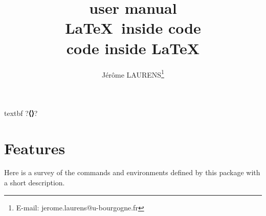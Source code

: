 \documentclass{article}
\begin{document}
\begin{CDRBlockSave}{textbf}
?\textbf{⟨⟩}?
\end{CDRBlockSave}
\title{ user manual\\
\LaTeX\ inside code\\
code inside \LaTeX
}
\author{Jérôme LAURENS\thanks{E-mail: jerome.laurens@u-bourgogne.fr}}
\maketitle
\tableofcontents
%
\section{Features}
Here is a survey of the commands and environments defined by this package with a short description.
\end{document}
